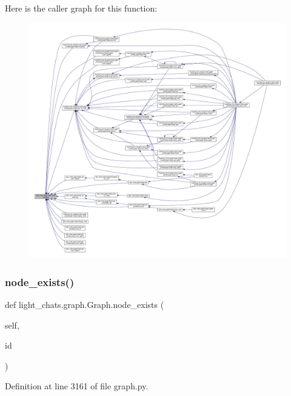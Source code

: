 Here is the caller graph for this function\+:
\nopagebreak
\begin{figure}[H]
\begin{center}
\leavevmode
\includegraphics[width=350pt]{classlight__chats_1_1graph_1_1Graph_aaf9882eb0e887eadf75e4f2460732c05_icgraph}
\end{center}
\end{figure}
\mbox{\label{classlight__chats_1_1graph_1_1Graph_ab0dd6685d8eb353d76eca8de20a39914}} 
\subsubsection{\texorpdfstring{node\+\_\+exists()}{node\_exists()}}
{\footnotesize\ttfamily def light\+\_\+chats.\+graph.\+Graph.\+node\+\_\+exists (\begin{DoxyParamCaption}\item[{}]{self,  }\item[{}]{id }\end{DoxyParamCaption})}



Definition at line 3161 of file graph.\+py.



